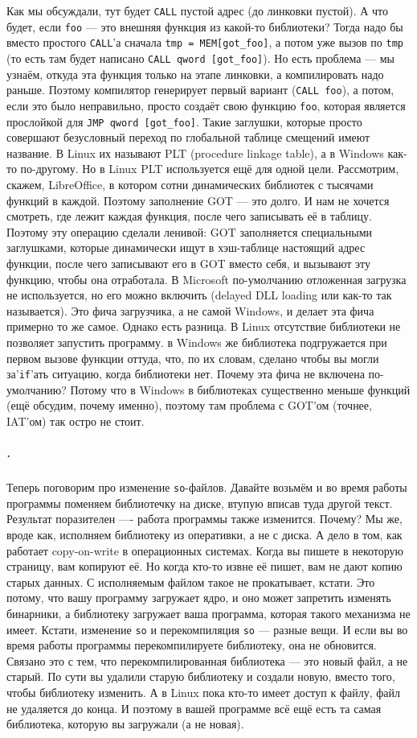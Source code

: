 \documentclass{article}
\newcommand{\asm}[1]{\texttt{#1}}
\begin{document}
    Как мы обсуждали, тут будет \asm{CALL} пустой адрес (до линковки пустой). А что будет, если \texttt{foo} --- это внешняя функция из какой-то библиотеки? Тогда надо бы вместо простого \asm{CALL}'а сначала \texttt{tmp = MEM[got_foo]}, а потом уже вызов по \texttt{tmp} (то есть там будет написано \asm{CALL qword [got_foo]}). Но есть проблема --- мы узнаём, откуда эта функция только на этапе линковки, а компилировать надо раньше. Поэтому компилятор генерирует первый вариант (\asm{CALL foo}), а потом, если это было неправильно, просто создаёт свою функцию \texttt{foo}, которая является прослойкой для \asm{JMP qword [got_foo]}. Такие заглушки, которые просто совершают безусловный переход по глобальной таблице смещений имеют название. В Linux их называют PLT (procedure linkage table), а в Windows как-то по-другому. Но в Linux PLT используется ещё для одной цели. Рассмотрим, скажем, LibreOffice, в котором сотни динамических библиотек с тысячами функций в каждой. Поэтому заполнение GOT --- это долго. И нам не хочется смотреть, где лежит каждая функция, после чего записывать её в таблицу. Поэтому эту операцию сделали ленивой: GOT заполняется специальными заглушками, которые динамически ищут в хэш-таблице настоящий адрес функции, после чего записывают его в GOT вместо себя, и вызывают эту функцию, чтобы она отработала. В Microsoft по-умолчанию отложенная загрузка не используется, но его можно включить (delayed DLL loading или как-то так называется). Это фича загрузчика, а не самой Windows, и делает эта фича примерно то же самое. Однако есть разница. В Linux отсутствие библиотеки не позволяет запустить программу. в Windows же библиотека подгружается при первом вызове функции оттуда, что, по их словам, сделано чтобы вы могли за'\texttt{if}'ать ситуацию, когда библиотеки нет. Почему эта фича не включена по-умолчанию? Потому что в Windows в библиотеках существенно меньше функций (ещё обсудим, почему именно), поэтому там проблема с GOT'ом (точнее, IAT'ом) так остро не стоит.
    \subparagraph{.}
    Теперь поговорим про изменение \texttt{so}-файлов. Давайте возьмём и во время работы программы поменяем библиотечку на диске, втупую вписав туда другой текст. Результат поразителен ---- работа программы также изменится. Почему? Мы же, вроде как, исполняем библиотеку из оперативки, а не с диска. А дело в том, как работает copy-on-write в операционных системах. Когда вы пишете в некоторую страницу, вам копируют её. Но когда кто-то извне её пишет, вам не дают копию старых данных. С исполняемым файлом такое не прокатывает, кстати. Это потому, что вашу программу загружает ядро, и оно может запретить изменять бинарники, а библиотеку загружает ваша программа, которая такого механизма не имеет. Кстати, изменение \texttt{so} и перекомпиляция \texttt{so} --- разные вещи. И если вы во время работы программы перекомпилируете библиотеку, она не обновится. Связано это с тем, что перекомпилированная библиотека --- это новый файл, а не старый. По сути вы удалили старую библиотеку и создали новую, вместо того, чтобы библиотеку изменить. А в Linux пока кто-то имеет доступ к файлу, файл не удаляется до конца. И поэтому в вашей программе всё ещё есть та самая библиотека, которую вы загружали (а не новая).
\end{document}
